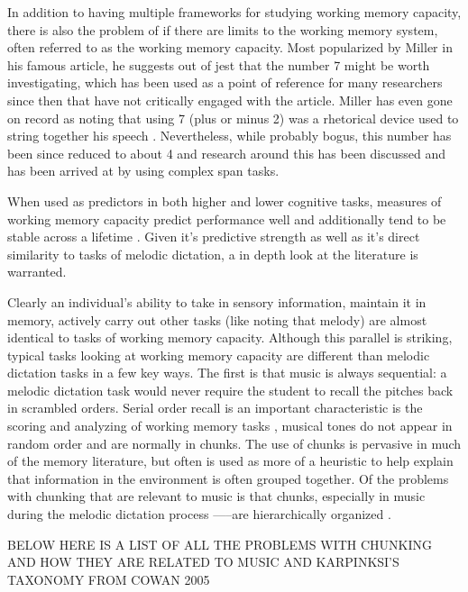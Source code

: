 \documentclass[]{book}
\theoremstyle{definition}
\theoremstyle{definition}
\theoremstyle{definition}
\theoremstyle{remark}
\begin{document}
In addition to having multiple frameworks for studying working memory
capacity, there is also the problem of if there are limits to the
working memory system, often referred to as the working memory capacity.
Most popularized by Miller in his famous
\citep{millerMagicalNumberSeven1956} article, he suggests out of jest
that the number 7 might be worth investigating, which has been used as a
point of reference for many researchers since then that have not
critically engaged with the article. Miller has even gone on record as
noting that using 7 (plus or minus 2) was a rhetorical device used to
string together his speech
\citep{millerHistoryPsychologyAutobiography1989}. Nevertheless, while
probably bogus, this number has been since reduced to about 4
\citep{cowanMagicalMysteryFour2010} and research around this has been
discussed and has been arrived at by using complex span tasks.

When used as predictors in both higher and lower cognitive tasks,
measures of working memory capacity predict performance well and
additionally tend to be stable across a lifetime
\citep{unsworthAutomatedVersionOperation2005}. Given it's predictive
strength as well as it's direct similarity to tasks of melodic
dictation, a in depth look at the literature is warranted.

Clearly an individual's ability to take in sensory information, maintain
it in memory, actively carry out other tasks (like noting that melody)
are almost identical to tasks of working memory capacity. Although this
parallel is striking, typical tasks looking at working memory capacity
are different than melodic dictation tasks in a few key ways. The first
is that music is always sequential: a melodic dictation task would never
require the student to recall the pitches back in scrambled orders.
Serial order recall is an important characteristic is the scoring and
analyzing of working memory tasks \citep{conwayWorkingMemorySpan2005},
musical tones do not appear in random order and are normally in chunks.
The use of chunks is pervasive in much of the memory literature, but
often is used as more of a heuristic to help explain that information in
the environment is often grouped together. Of the problems with chunking
that are relevant to music is that chunks, especially in music during
the melodic dictation process -----are hierarchically organized
\citep{krumhanslCognitiveFoundationsMusical2001, meyerEmotionMeaningMusic1956}.

BELOW HERE IS A LIST OF ALL THE PROBLEMS WITH CHUNKING AND HOW THEY ARE
RELATED TO MUSIC AND KARPINKSI'S TAXONOMY FROM COWAN 2005
\end{document}

